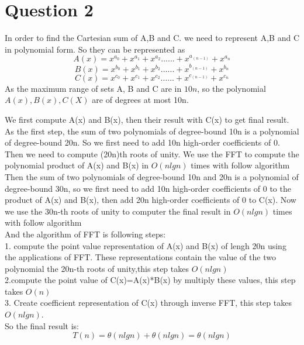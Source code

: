 \documentclass[paper=a4, fontsize=11pt]{scrartcl} %
\numberwithin{equation}{section} %
\numberwithin{figure}{section} %
\numberwithin{table}{section} %
\begin{document}
\vspace{2cm}
\section{Question 2}
In order to find the Cartesian sum of A,B and C. we need to represent A,B and C in polynomial form. So they can be represented as
$$A(x)=x^{a_0}+x^{a_1}+x^{a_2}......+x^{a_(n-1)}+x^{a_n}$$
$$B(x)=x^{b_0}+x^{b_1}+x^{b_2}......+x^{b_(n-1)}+x^{b_n}$$
$$C(x)=x^{c_0}+x^{c_1}+x^{c_2}......+x^{c_(n-1)}+x^{c_n}$$
As the maximum range of sets A, B and C are in $10n$, so the polynomial $A(x),B(x), C(X)$ are of degrees at most 10n.

We first compute A(x) and B(x), then their result with C(x) to get final result.\\
As the first step, the sum of two polynomials of degree-bound 10n is a polynomial of degree-bound 20n. So we first need to add 10n high-order coefficients of 0. Then we need to compute (20n)th roots of unity. We use the  FFT to compute the polynomial product of A(x) and B(x) in $O(nlgn)$ times with follow algorithm\\
Then the sum of two polynomials of degree-bound 10n and 20n is a polynomial of degree-bound 30n, so we first need to add 10n high-order coefficients of 0 to the product of A(x) and B(x), then add 20n high-order coefficients of 0 to C(x). Now we use the 30n-th roots of unity to computer the final result in $O(nlgn)$ times with follow algorithm \\
And the algorithm of FFT is following steps:\\
1. compute the point value representation of A(x) and B(x) of lengh 20n using the applications of FFT. These representations contain the value of the two polynomial the 20n-th roots of unity,this step takes $O(nlgn)$\\
2.compute the point value of C(x)=A(x)*B(x) by multiply these values, this step takes $O(n)$\\
3. Create coefficient representation of C(x) through inverse FFT, this step takes $O(nlgn)$.\\
So the final result is:\\
$$T(n)=\theta(nlgn)+\theta(nlgn)=\theta(nlgn)$$


\vspace{2cm}
\end{document}
